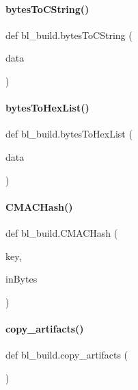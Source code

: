 \paragraph{\texorpdfstring{bytes\+To\+C\+String()}{bytesToCString()}}
{\footnotesize\ttfamily def bl\+\_\+build.\+bytes\+To\+C\+String (\begin{DoxyParamCaption}\item[{}]{data }\end{DoxyParamCaption})}

\mbox{\label{namespacebl__build_ae3dfab9be466704491cdc270ac523004}} 
\paragraph{\texorpdfstring{bytes\+To\+Hex\+List()}{bytesToHexList()}}
{\footnotesize\ttfamily def bl\+\_\+build.\+bytes\+To\+Hex\+List (\begin{DoxyParamCaption}\item[{}]{data }\end{DoxyParamCaption})}

\mbox{\label{namespacebl__build_a097a5019a83d65ad61254db9a76624eb}} 
\paragraph{\texorpdfstring{C\+M\+A\+C\+Hash()}{CMACHash()}}
{\footnotesize\ttfamily def bl\+\_\+build.\+C\+M\+A\+C\+Hash (\begin{DoxyParamCaption}\item[{}]{key,  }\item[{}]{in\+Bytes }\end{DoxyParamCaption})}

\mbox{\label{namespacebl__build_acf40ffadbc5a33f27984829b1089e12a}} 
\paragraph{\texorpdfstring{copy\+\_\+artifacts()}{copy\_artifacts()}}
{\footnotesize\ttfamily def bl\+\_\+build.\+copy\+\_\+artifacts (\begin{DoxyParamCaption}{ }\end{DoxyParamCaption})}

